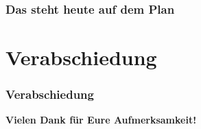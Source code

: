 \documentclass[
    ngerman,
    accentcolor=3b,
    fontsize= 12pt,
    a4paper,
    aspectratio=169,
    colorback=true,
    fancy_row_colors,
    leqno,
    fleqn,
    boxarc=3pt,
    fleqn,
    main,
    design=2008,
]{algoslides}
\title[\shortworkshoptitle{}]{\workshoptitle{}}
\date{\today}
\begin{document}

    \maketitle{}

    \begin{frame}[c]
        \centering\huge\textbf{\gruesswoerte{}}
    \end{frame}


    \begin{frame}
        \frametitle{Das steht heute auf dem Plan}
        \tableofcontents[subsubsectionstyle=hide]
    \end{frame}



    

    \section{Verabschiedung}
    \begin{frame}[c]
        \frametitle{Verabschiedung}
        \centering
        \huge\textbf{Vielen Dank für Eure Aufmerksamkeit!}
    \end{frame}
\end{document}
